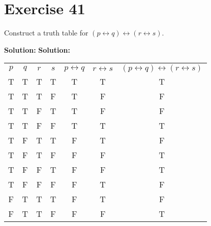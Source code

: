\documentclass{Axon}
\begin{document}
\section*{Exercise 41}
Construct a truth table for \((p \leftrightarrow q) \leftrightarrow (r \leftrightarrow s)\).

\noindent
\textbf{Solution:}
\noindent
\textbf{Solution:}
\begin{table}[ht]
    \centering
    \begin{tabular}{c|c|c|c|c|c|c}
    \(p\) & \(q\) & \(r\) & \(s\) & \(p \leftrightarrow q\) & \(r \leftrightarrow s\) & \((p \leftrightarrow q) \leftrightarrow (r \leftrightarrow s)\) \\
    T     & T     & T     & T     & T                       & T                       & T                                                               \\
    T     & T     & T     & F     & T                       & F                       & F                                                               \\
    T     & T     & F     & T     & T                       & F                       & F                                                               \\
    T     & T     & F     & F     & T                       & T                       & T                                                               \\
    T     & F     & T     & T     & F                       & T                       & F                                                               \\
    T     & F     & T     & F     & F                       & F                       & T                                                               \\
    T     & F     & F     & T     & F                       & F                       & T                                                               \\
    T     & F     & F     & F     & F                       & T                       & F                                                               \\
    F     & T     & T     & T     & F                       & T                       & F                                                               \\
    F     & T     & T     & F     & F                       & F                       & T                                                               \\

\end{tabular}
\end{table}
\end{document}

